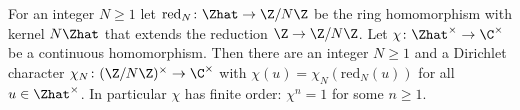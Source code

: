 For an integer $N\ge1$ let $\mathrm{red}_N\colon\Zhat\to\Z/N\Z$ be the ring homomorphism with kernel $N\Zhat$ that
extends the reduction $\Z\to\Z/N\Z$. Let $\chi\colon\Zhat^\times\to\C^\times$ be a continuous homomorphism. Then
there are an integer $N\ge1$ and a Dirichlet character $\chi_N\colon(\Z/N\Z)^\times\to\C^\times$ with
$\chi(u)=\chi_N(\mathrm{red}_N(u))$ for all $u\in\Zhat^\times$. In particular $\chi$ has finite order:
$\chi^n=1$ for some $n\ge1$.
